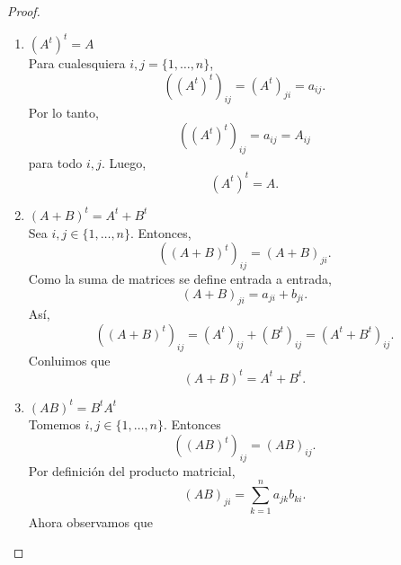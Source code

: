\documentclass[12pt,a4paper]{article}
\begin{document}
    \begin{proof}
        \begin{enumerate}
            \item[(a)] $(A^{t})^{t}=A$\\
            Para cualesquiera $i,j=\{1,\dots,n\}$,
            \begin{equation*}
                ((A^{t})^{t})_{ij}=(A^{t})_{ji}=a_{ij}.
            \end{equation*}
            Por lo tanto,
            \begin{equation*}
                ((A^{t})^{t})_{ij}=a_{ij}=A_{ij}
            \end{equation*}
            para todo $i,j$. Luego,
            \begin{equation*}
                (A^{t})^{t}=A.
            \end{equation*}
            \item[(b)] $(A+B)^{t}=A^{t}+B^{t}$\\
            Sea $i,j\in\{1,\dots,n\}$. Entonces,
            \begin{equation*}
                ((A+B)^{t})_{ij}=(A+B)_{ji}.
            \end{equation*}
            Como la suma de matrices se define entrada a entrada,
            \begin{equation*}
                (A+B)_{ji}=a_{ji}+b_{ji}.
            \end{equation*}
            Así,
            \begin{equation*}
                ((A+B)^{t})_{ij}=(A^{t})_{ij}+(B^{t})_{ij}=(A^{t}+B^{t})_{ij}.
            \end{equation*}
            Conluimos que
            \begin{equation*}
                (A+B)^{t}=A^{t}+B^{t}.
            \end{equation*}
            \item[(c)] $(AB)^{t}=B^{t}A^{t}$\\
            Tomemos $i,j\in\{1,\dots,n\}$. Entonces
            \begin{equation*}
                ((AB)^{t})_{ij}=(AB)_{ij}.
            \end{equation*}
            Por definición del producto matricial,
            \begin{equation*}
                (AB)_{ji}=\sum_{k=1}^{n}a_{jk}b_{ki}.
            \end{equation*}
            Ahora observamos que
            \begin{equation*}

\end{equation*}
\end{enumerate}
\end{proof}
\end{document}
